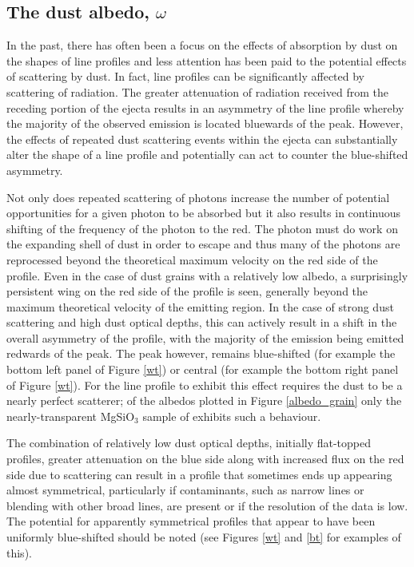 \subsection{The dust albedo, $\omega$}
\label{omega}

In the past, there has often been a focus on the effects of absorption by 
dust on the shapes of line profiles and less attention has been paid to 
the potential effects of scattering by dust.  In fact, line profiles can 
be significantly affected by scattering of radiation.  The greater 
attenuation of radiation received from the receding portion of the ejecta 
results in an asymmetry of the line profile whereby the majority of the 
observed emission is located bluewards of the peak.  However, the effects 
of repeated dust scattering events within the ejecta can substantially 
alter the shape of a line profile and potentially can act to counter the 
blue-shifted asymmetry.

Not only does repeated scattering of photons increase the number of 
potential opportunities for a given photon to be absorbed but it also 
results in continuous shifting of the frequency of the photon to the red.  
The photon must do work on the expanding shell of dust in order to escape 
and thus many of the photons are reprocessed beyond the theoretical 
maximum velocity on the red side of the profile.  Even in the case of dust 
grains with a relatively low albedo, a surprisingly persistent wing on the 
red side of the profile is seen, generally beyond the maximum theoretical 
velocity of the emitting region. In the case of strong dust scattering and 
high dust optical depths, this can actively result in a shift in the 
overall asymmetry of the profile, with the majority of the emission being 
emitted redwards of the peak. The peak however, remains blue-shifted (for 
example the bottom left panel of Figure \ref{wt}) or central (for example 
the bottom right panel of Figure \ref{wt}).  For the line profile to 
exhibit this effect requires the dust to be a nearly perfect scatterer;
of the albedos plotted in Figure \ref{albedo_grain}
only the nearly-transparent MgSiO$_3$ sample of \citet{Jager2003}
exhibits such a behaviour.

The combination of relatively low dust optical depths, initially 
flat-topped profiles, greater attenuation on the blue side along with 
increased flux on the red side due to scattering can result in a profile 
that sometimes ends up appearing almost symmetrical, particularly if 
contaminants, such as narrow lines or blending with other broad lines, are 
present or if the resolution of the data is low.  The potential for 
apparently symmetrical profiles that appear to have been uniformly 
blue-shifted should be noted (see Figures \ref{wt} and \ref{bt} for 
examples of this).


